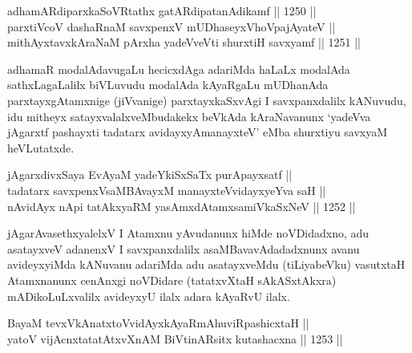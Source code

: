 
\begin{shl}
adhamARdiparxka\footnotemark[1]SoVRtathx \footnotemark[2]gatARdipatanAdikamf \hfill || 1250 || \\
parxtiVcoV dashaRnaM savxpenxV mUDhaseyxVhoVpajAyateV ||  \\
\footnotemark[3]mithAyxtavxkAraNaM pArxha yadeVveVti shurxtiH savxyamf \hfill || 1251 ||  
\end{shl}

\begin{artha}
adhamaR modalAdavugaLu hecicxdAga adariMda haLaLx modalAda sathxLagaLalilx biVLuvudu modalAda kAyaRgaLu mUDhanAda parxtayxgAtamxnige (jiVvanige) parxtayxkaSxvAgi I savxpanxdalilx kANuvudu, idu mitheyx satayxvalalxveMbudakekx beVkAda kAraNavanunx `yadeVva jAgarxtf pashayxti tadatarx avidayxyAmanayxteV' eMba shurxtiyu savxyaM heVLutatxde.
\end{artha}


\begin{shl}
jAgarxdivxSaya EvAyaM yadeYkiSxSaTx purA\s payxsatf || \\
tadatarx savxpenxV\s saMBAvayxM manayxteV\s vidayxyeYva saH || \\
nAvidAyx nApi tatAkxyaRM yasAmxdAtamxsamiVkaSxNeV \hfill || 1252 ||  
\end{shl}

\begin{artha}
jAgarAvasethxyalelxV I Atamxnu yAvudanunx hiMde noVDidadxno, adu asatayxveV adanenxV I savxpanxdalilx asaMBavavAdadadxnunx avanu avideyxyiMda kANuvanu adariMda adu asatayxveMdu (tiLiyabeVku) vasutxtaH Atamxnanunx cenAnxgi noVDidare (tatatxvXtaH sAkASxtAkxra) mADikoLuLxvalilx avideyxyU ilalx adara kAyaRvU ilalx.
\end{artha}

\begin{shl}
BayaM tevxVkAnatxtoV\s vidAyxkAyaRmAhuviRpashicxtaH ||  \\
yatoV vijAcnxtatatAtxvXnAM BiVtinARsitx kutashacxna \hfill || 1253 ||  
\end{shl}

